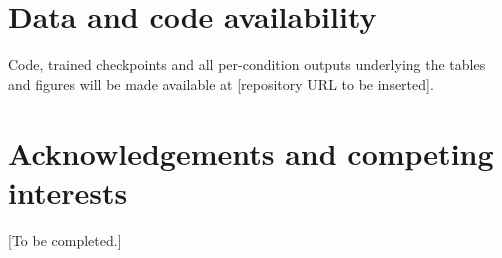 \documentclass[a4paper,11pt]{article}
\begin{document}
\section*{Data and code availability}
Code, trained checkpoints and all per-condition outputs underlying the
tables and figures will be made available at [repository URL to be
inserted].

\section*{Acknowledgements and competing interests}
[To be completed.]



\end{document}
